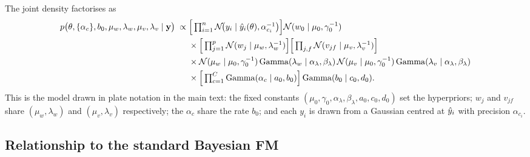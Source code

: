 The joint density factorises as
\begin{equation}
\begin{aligned}
  p\big(\theta,\{\alpha_c\},b_0,\mu_w,\lambda_w,\mu_v,\lambda_v \mid \mathbf{y}\big)
  \;\propto\;
  & \Big[\textstyle\prod_{i=1}^{n} \mathcal{N}\!\big(y_i \mid \hat{y}_i(\theta),\alpha_{c_i}^{-1}\big)\Big]
    \mathcal{N}(w_0\mid\mu_0,\gamma_0^{-1}) \\
  &\times \Big[\textstyle\prod_{j=1}^{p}\mathcal{N}(w_j\mid\mu_w,\lambda_w^{-1})\Big]
          \Big[\textstyle\prod_{j,f}\mathcal{N}(v_{jf}\mid\mu_v,\lambda_v^{-1})\Big] \\
  &\times \mathcal{N}(\mu_w\mid\mu_0,\gamma_0^{-1})\,\mathrm{Gamma}(\lambda_w\mid\alpha_\lambda,\beta_\lambda)\,
          \mathcal{N}(\mu_v\mid\mu_0,\gamma_0^{-1})\,\mathrm{Gamma}(\lambda_v\mid\alpha_\lambda,\beta_\lambda) \\
  &\times \Big[\textstyle\prod_{c=1}^{C}\mathrm{Gamma}(\alpha_c\mid a_0,b_0)\Big]\,\mathrm{Gamma}(b_0\mid c_0,d_0).
\end{aligned}
\label{eq:joint}
\end{equation}
This is the model drawn in plate notation in the main text: the fixed constants
$(\mu_0,\gamma_0,\alpha_\lambda,\beta_\lambda,a_0,c_0,d_0)$ set the hyperpriors;
$w_j$ and $v_{jf}$ share $(\mu_w,\lambda_w)$ and $(\mu_v,\lambda_v)$
respectively; the $\alpha_c$ share the rate $b_0$; and each $y_i$ is drawn from a
Gaussian centred at $\hat{y}_i$ with precision $\alpha_{c_i}$.

\subsection{Relationship to the standard Bayesian FM}
\label{sec:diff}

